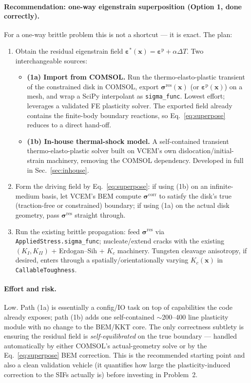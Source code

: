 \documentclass[11pt]{article}
\newcommand{\xvec}{\mathbf{x}}
\newcommand{\epspl}{\bm{\varepsilon}^{\mathrm{p}}}
\newcommand{\epsstar}{\bm{\varepsilon}^{*}}
\newcommand{\sig}{\bm{\sigma}}
\begin{document}
\paragraph{Recommendation: one-way eigenstrain superposition (Option 1, done
correctly).} For a one-way brittle problem this is not a shortcut --- it is
exact. The plan:
\begin{enumerate}[leftmargin=1.4em]
\item Obtain the residual eigenstrain field $\epsstar(\xvec)=\epspl+\alpha\Delta T$.
  Two interchangeable sources:
  \begin{itemize}[leftmargin=1.2em]
  \item \textbf{(1a) Import from COMSOL.} Run the thermo-elasto-plastic
    transient of the constrained disk in COMSOL, export $\sig^{\mathrm{res}}(\xvec)$
    (or $\epspl(\xvec)$) on a mesh, and wrap a SciPy interpolant as
    \texttt{sigma\_func}. Lowest effort; leverages a validated FE plasticity
    solver. The exported field already contains the finite-body boundary
    reactions, so Eq.~\eqref{eq:superpose} reduces to a direct hand-off.
  \item \textbf{(1b) In-house thermal-shock model.} A self-contained transient
    thermo-elasto-plastic solver built on VCEM's own dislocation/initial-strain
    machinery, removing the COMSOL dependency. Developed in full in
    Sec.~\ref{sec:inhouse}.
  \end{itemize}
\item Form the driving field by Eq.~\eqref{eq:superpose}: if using (1b) on an
  infinite-medium basis, let VCEM's BEM compute $\sig^{\mathrm{corr}}$ to satisfy
  the disk's true (traction-free or constrained) boundary; if using (1a) on the
  actual disk geometry, pass $\sig^{\mathrm{res}}$ straight through.
\item Run the existing brittle propagation: feed $\sig^{\mathrm{res}}$ via
  \texttt{AppliedStress.sigma\_func}; nucleate/extend cracks with the existing
  $(K_I,K_{II})$ + Erdogan--Sih + $K_c$ machinery. Tungsten cleavage anisotropy,
  if desired, enters through a spatially/orientationally varying $K_c(\xvec)$ in
  \texttt{CallableToughness}.
\end{enumerate}

\paragraph{Effort and risk.} Low. Path (1a) is essentially a config/IO task on
top of capabilities the code already exposes; path (1b) adds one self-contained
$\sim$200--400 line plasticity module with no change to the BEM/KKT core. The
only correctness subtlety is ensuring the residual field is
\emph{self-equilibrated} on the true boundary --- handled automatically by
either COMSOL's actual-geometry solve or by the
Eq.~\eqref{eq:superpose} BEM correction. This is the recommended starting point
and also a clean validation vehicle (it quantifies how large the
plasticity-induced correction to the SIFs actually is) before investing in
Problem~2.
\end{document}
